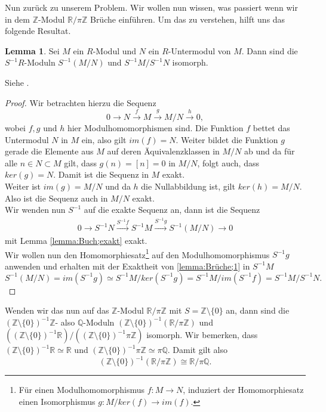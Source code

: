 \documentclass[11pt,titlepage]{article}
\newcommand{\setZ}{\mathbb{Z}}
\newcommand{\setQ}{\mathbb{Q}}
\newcommand{\setR}{\mathbb{R}}
\theoremstyle{definition}
\newtheorem{lemma}[theorem]{Lemma}
\theoremstyle{remark}
\begin{document}
	Nun zurück zu unserem Problem. Wir wollen nun wissen, was passiert wenn 
	wir in dem $\setZ$-Modul $\setR /\pi\setZ$ Brüche einführen. Um das 
	zu verstehen, hilft uns das folgende Resultat.
	
	\begin{lemma}
		Sei $M$ ein $R$-Modul und $N$ ein $R$-Untermodul von $M$. Dann sind die $S^{-1}R$-Moduln $S^{-1}(M/N)$ und 
		$S^{-1}M/S^{-1}N$ isomorph.
	\end{lemma}
	
	Siehe \cite[Korollar 3.4 (iii)]{introductiontocomalg}.
	
	\begin{proof}
		Wir betrachten hierzu die Sequenz
		\[0\to N\xrightarrow{f} M\xrightarrow{g} M/N\xrightarrow{h} 0,\]
		wobei $f,g$ und $h$ hier Modulhomomorphismen sind. Die Funktion 
		$f$ bettet das Untermodul $N$ in $M$ ein, also gilt 
		$im(f)=N$. Weiter bildet die Funktion $g$ gerade die Elemente aus $M$ 
		auf deren Äquivalenzklassen in $M/N$ ab und da für alle $n\in N\subset M$ 
		gilt, dass $g(n)=[n]=0$ in $M/N$, folgt auch, dass $ker(g)=N$. Damit 
		ist die Sequenz in $M$ exakt. \\
		Weiter ist $im(g)=M/N$ und da $h$ die Nullabbildung ist, gilt $ker(h)=M/N$. 
		Also ist die Sequenz auch in $M/N$ exakt. \\
		Wir wenden nun $S^{-1}$ auf die exakte Sequenz an, dann ist die Sequenz
		\begin{align}
			0\to S^{-1}N \xrightarrow{S^{-1}f} S^{-1}M \xrightarrow{S^{-1}g}
			S^{-1}(M/N)\to 0 \label{lemma:Brüche;1}
		\end{align}
		mit Lemma \ref{lemma:Buch;exakt} exakt. \\
		Wir wollen nun den Homomorphiesatz\footnote{Für einen Modulhomomorphismus 
		$f:M\to N$, induziert der Homomorphiesatz einen Isomorphismus 
		$g:M/ker(f)\to im(f)$.} auf den Modulhomomorphismus 
		$S^{-1}g$ anwenden und erhalten mit der Exaktheit von \ref{lemma:Brüche;1} 
		in $S^{-1}M$
		\[ S^{-1}(M/N)=im(S^{-1}g)\simeq S^{-1}M/ker(S^{-1}g) =S^{-1}M/im(S^{-1}f)=S^{-1}M/S^{-1}N.\]
	\end{proof}
	
	Wenden wir das nun auf das $\setZ$-Modul $\setR /\pi\setZ$ mit 
	$S=\setZ\setminus\{0\}$ an, dann sind die $(\setZ\setminus\{0\})^{-1}\setZ$- also $\setQ$-Moduln 
	$(\setZ\setminus\{0\})^{-1}(\setR /\pi\setZ)$ und 
	$\left((\setZ\setminus\{0\})^{-1}\setR\right) /\left((\setZ\setminus\{0\})^{-1}\pi\setZ\right)$ 
	isomorph. Wir bemerken, dass $(\setZ\setminus\{0\})^{-1}\setR\simeq\setR$ und 
	$(\setZ\setminus\{0\})^{-1}\pi\setZ\simeq\pi\setQ$. Damit gilt also 
	\[ (\setZ\setminus\{0\})^{-1}(\setR /\pi\setZ)\cong \setR/\pi\setQ.\]
	
\end{document}
